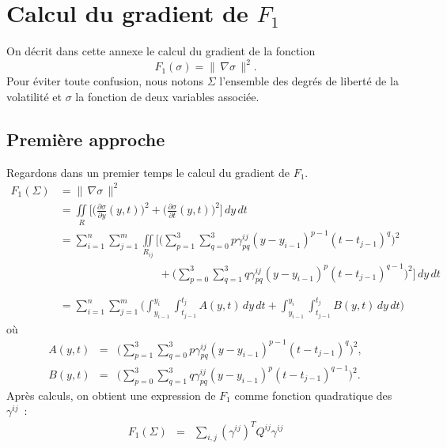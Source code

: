 \section{Calcul du gradient de $F_1$ \label{gradF1}}
\label{ANN:GRADF1}

On d\'ecrit dans cette annexe le calcul du gradient de la fonction 
$$
F_1(\sigma) = \| \, \nabla \sigma \, \|^2.
$$
Pour \'eviter toute confusion, nous notons $\Sigma$ l'ensemble 
des degr\'es de libert\'e de la volatilit\'e et $\sigma$ la 
fonction de deux variables associ\'ee.

\subsection{Premi\`ere approche}

Regardons dans un premier temps le calcul du gradient de $F_1$.
\begin{equation*}
\begin{split}
F_1(\Sigma) &= \| \, \nabla \sigma \, \|^2 \\
&= \iint\limits_{R} \biggl [\biggl 
(\frac{\partial\sigma}{\partial y}(y,t)\biggr)^2 + 
\biggl(\frac{\partial\sigma}{\partial t}(y,t)\biggr)^2 
\biggr]\,dy\,dt\\
&= \sum_{i=1}^{n} \sum_{j=1}^{m} \iint\limits_{R_{ij}} 
\biggl [ \biggl ( \sum_{p=1}^3 \sum_{q=0}^3 
p\gamma_{pq}^{ij}(y-y_{i-1})^{p-1}(t-t_{j-1})^q \biggr )^2\\
& \phantom{= \sum_{i=1}^{n} \sum_{j=1}^{m} \iint\limits_{R_{ij}} 
\biggl [} + \biggl (\sum_{p=0}^3 \sum_{q=1}^3 
q\gamma_{pq}^{ij}(y-y_{i-1})^p(t-t_{j-1})^{q-1} 
\biggr)^2 \biggr] \,dy \,dt\\
&=  \sum_{i=1}^{n} \sum_{j=1}^{m} \biggl ( \int_{y_{i-1}}^{y_i} 
\int_{t_{j-1}}^{t_j} A(y,t) \,dy\,dt + 
\int_{y_{i-1}}^{y_i} \int_{t_{j-1}}^{t_j} B(y,t) \,dy\,dt \biggr)
\end{split}
\end{equation*}
o\`u 
\begin{eqnarray*}
A(y,t) &=&  \biggl (\sum_{p=1}^3 \sum_{q=0}^3 
p\gamma_{pq}^{ij}(y-y_{i-1})^{p-1}(t-t_{j-1})^q \biggr)^2,\\
B(y,t) &=&  \biggl (\sum_{p=0}^3 \sum_{q=1}^3 
q\gamma_{pq}^{ij}(y-y_{i-1})^p(t-t_{j-1})^{q-1} \biggr)^2.
\end{eqnarray*}
Apr\`es calculs, on obtient une expression de $F_1$ comme fonction 
quadratique des $\gamma^{ij}$~:
\begin{eqnarray*}
F_1(\Sigma) &=& \sum\limits_{i,j} (\gamma^{ij})^T Q^{ij} \gamma^{ij}
\end{eqnarray*}
